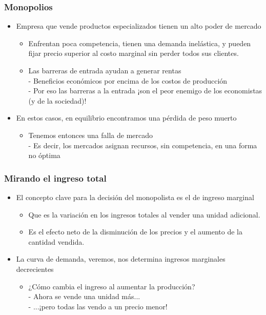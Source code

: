 \documentclass{beamer}
\begin{document}
\begin{frame}
\frametitle{Monopolios}
\begin{itemize}
    \item Empresa que vende productos especializados tienen un alto poder de mercado\vspace{2mm}
    \begin{itemize}
        \item Enfrentan poca competencia, tienen una demanda inelástica, y pueden fijar precio superior al costo marginal sin perder todos sus clientes.\vspace{1mm}
        \item Las barreras de entrada ayudan a generar rentas \\
        - Beneficios económicos por encima de los costos de producción \\
        - Por eso las barreras a la entrada ¡son el peor enemigo de los economistas (y de la sociedad)!\vspace{4mm}
    \end{itemize}
    \item En estos casos, en equilibrio encontramos una pérdida de peso muerto
    \begin{itemize}
        \item Tenemos entonces una falla de mercado \\
        - Es decir, los mercados asignan recursos, sin competencia, en una forma no óptima 
    \end{itemize}
    \end{itemize}
\end{frame}


\begin{frame}
\frametitle{Mirando el ingreso total}
\begin{itemize}
    \item El concepto clave para la decisión del monopolista es el de ingreso marginal\vspace{2mm}
    \begin{itemize}
        \item Que es la variación en los ingresos totales al vender una unidad adicional.\vspace{1mm}
        \item Es el efecto neto de la disminución de los precios y el aumento de la cantidad vendida.\vspace{4mm}
    \end{itemize}
    \item La curva de demanda, veremos, nos determina ingresos marginales decrecientes\vspace{2mm}
    \begin{itemize}
        \item ¿Cómo cambia el ingreso al aumentar la producción? \\\vspace{1mm}
        - Ahora se vende una unidad más... \\
        - ...¡pero todas las vendo a un precio menor!
    \end{itemize}
\end{itemize}
\end{frame}
\end{document}
